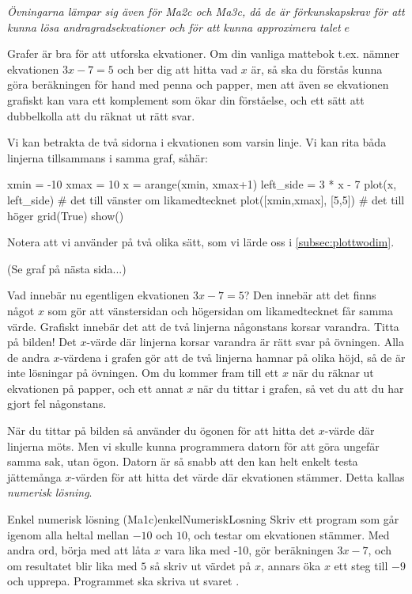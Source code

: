 \emph{Övningarna lämpar sig även för Ma2c och Ma3c, då de är förkunskapskrav för att kunna lösa andragradsekvationer och för att kunna approximera talet $e$}

Grafer är bra för att utforska ekvationer. Om din vanliga mattebok t.ex. nämner ekvationen $3x-7=5$ och ber dig att hitta vad $x$ är, så ska du förstås kunna göra beräkningen för hand med penna och papper, men att även se ekvationen grafiskt kan vara ett komplement som ökar din förståelse, och ett sätt att dubbelkolla att du räknat ut rätt svar.

Vi kan betrakta de två sidorna i ekvationen som varsin linje. Vi kan rita båda linjerna tillsammans i samma graf, såhär:
\vspace{10pt}
\begin{python}
xmin = -10
xmax = 10
x = arange(xmin, xmax+1)
left_side = 3 * x - 7
plot(x, left_side) # det till vänster om likamedtecknet
plot([xmin,xmax], [5,5]) # det till höger
grid(True)
show()
\end{python}

Notera att vi använder  på två olika sätt, som vi lärde oss i \autoref{subsec:plottwodim}.

(Se graf på nästa sida...)
\newpage
{}

Vad innebär nu egentligen ekvationen $3x-7=5$? Den innebär att det finns något $x$ som gör att vänstersidan och högersidan om likamedtecknet får samma värde. Grafiskt innebär det att de två linjerna någonstans korsar varandra. Titta på bilden! Det $x$-värde där linjerna korsar varandra är rätt svar på övningen. Alla de andra $x$-värdena i grafen gör att de två linjerna hamnar på olika höjd, så de är inte lösningar på övningen. Om du kommer fram till ett $x$ när du räknar ut ekvationen på papper, och ett annat $x$ när du tittar i grafen, så vet du att du har gjort fel någonstans.


När du tittar på bilden så använder du ögonen för att hitta det $x$-värde där linjerna möts. Men vi skulle kunna programmera datorn för att göra ungefär samma sak, utan ögon. Datorn är så snabb att den kan helt enkelt testa jättemånga $x$-värden för att hitta det värde där ekvationen stämmer. Detta kallas \emph{numerisk lösning}.

\begin{matteovning}{Enkel numerisk lösning (Ma1c)}{enkelNumeriskLosning}
Skriv ett program som går igenom alla heltal mellan $-10$ och $10$, och testar om ekvationen stämmer. Med andra ord, börja med att låta $x$ vara lika med -10, gör beräkningen $3x-7$, och om resultatet blir lika med $5$ så skriv ut värdet på $x$, annars öka $x$ ett steg till $-9$ och upprepa. Programmet ska skriva ut svaret .
\end{matteovning}

